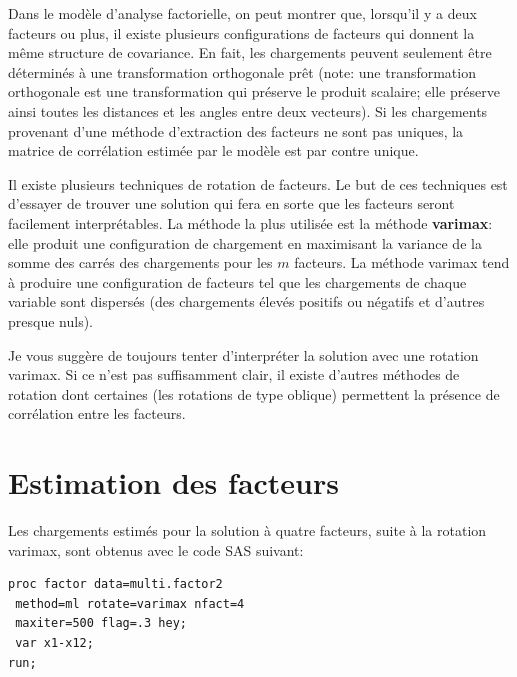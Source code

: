\documentclass[
  11pt,
  letterpaper,
]{book}
\theoremstyle{definition}
\theoremstyle{definition}
\theoremstyle{definition}
\theoremstyle{remark}
\begin{document}
Dans le modèle d'analyse factorielle, on peut montrer que, lorsqu'il y a deux facteurs ou plus, il existe plusieurs configurations de facteurs qui donnent la même structure de covariance. En fait, les chargements peuvent seulement être déterminés à une transformation orthogonale prêt (note: une transformation orthogonale est une transformation qui préserve le produit scalaire; elle préserve ainsi toutes les distances et les angles entre deux vecteurs). Si les chargements provenant d'une méthode d'extraction des facteurs ne sont pas uniques, la matrice de corrélation estimée par le modèle est par contre unique.

Il existe plusieurs techniques de rotation de facteurs. Le but de ces techniques est d'essayer de trouver une solution qui fera en sorte que les facteurs seront facilement interprétables. La méthode la plus utilisée est la méthode \textbf{varimax}: elle produit une configuration de chargement en maximisant la variance de la somme des carrés des chargements pour les \(m\) facteurs. La méthode varimax tend à produire une configuration de facteurs tel que les chargements de chaque variable sont dispersés (des chargements élevés positifs ou négatifs et d'autres presque nuls).

Je vous suggère de toujours tenter d'interpréter la solution avec une rotation varimax. Si ce n'est pas suffisamment clair, il existe d'autres méthodes de rotation dont certaines (les rotations de type oblique) permettent la présence de corrélation entre les facteurs.

\hypertarget{estimation-des-facteurs}{%
\section{Estimation des facteurs}\label{estimation-des-facteurs}}

Les chargements estimés pour la solution à quatre facteurs, suite à la rotation varimax, sont obtenus avec le code SAS suivant:

\begin{verbatim}
proc factor data=multi.factor2 
 method=ml rotate=varimax nfact=4
 maxiter=500 flag=.3 hey;
 var x1-x12;
run;
\end{verbatim}
\end{document}
